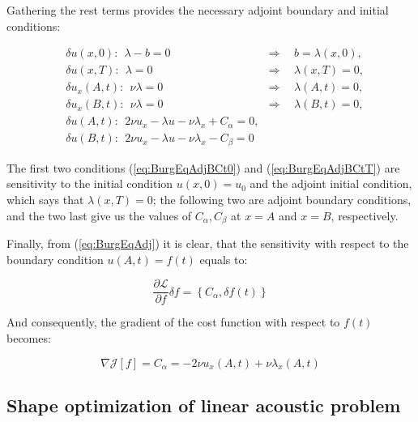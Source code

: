 Gathering the rest terms provides the necessary adjoint boundary and initial conditions:

\begin{subequations}
\begin{align}
    \label{eq:BurgEqAdjBCt0}
    & \delta u(x,0): \ \ \lambda - b = 0 & \Rightarrow \ \ & b = \lambda(x,0),\\
    \label{eq:BurgEqAdjBCtT}
    & \delta u(x,T): \ \ \lambda = 0 & \Rightarrow \ \ & \lambda(x,T) = 0 ,\\
    & \delta u_x(A,t): \ \ \nu \lambda = 0 & \Rightarrow \ \ & \lambda(A,t) = 0, \\
    & \delta u_x(B,t): \ \ \nu \lambda = 0 & \Rightarrow \ \ & \lambda(B,t) = 0, \\
    & \delta u(A,t): \ \ 2 \nu u_x - \lambda u - \nu \lambda_x + C_{\alpha} = 0, \\
    & \delta u(B,t): \ \ 2 \nu u_x - \lambda u - \nu \lambda_x - C_{\beta} = 0
\end{align}
\end{subequations}

The first two conditions (\ref{eq:BurgEqAdjBCt0}) and (\ref{eq:BurgEqAdjBCtT}) are sensitivity to the initial condition $u(x,0) = u_0$ and the adjoint initial condition, which says that $\lambda(x,T) = 0$; the following two are adjoint boundary conditions, and the two last give us the values of $C_{\alpha}, C_{\beta}$ at $x = A$ and $x = B$, respectively.

Finally, from (\ref{eq:BurgEqAdj}) it is clear, that the sensitivity with respect to the boundary condition $u(A,t) = f(t)$ equals to:

\begin{equation}
\frac{\partial \mathcal{L}}{\partial f} \delta f = \left\{C_{\alpha} , \delta f(t)  \right\}
\end{equation}

And consequently, the gradient of the cost function with respect to $f(t)$ becomes:

\begin{equation}
\nabla \mathcal{J}[f] = C_{\alpha} = -2 \nu u_x (A,t) + \nu \lambda_x (A,t)
\end{equation}

\subsection{Shape optimization of linear acoustic problem}

\clearpage

